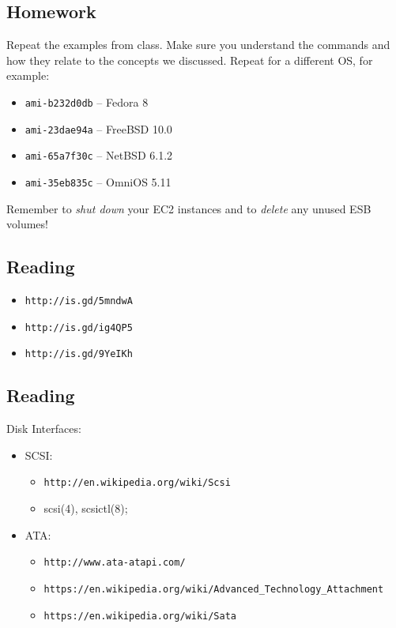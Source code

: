 \documentclass[xga]{xdvislides}
\begin{document}
\subsection{Homework}
Repeat the examples from class.  Make sure you understand the commands and
how they relate to the concepts we discussed.  Repeat for a different OS,
for example: \\

\begin{itemize}
	\item {\tt ami-b232d0db} -- Fedora 8
	\item {\tt ami-23dae94a} -- FreeBSD 10.0
	\item {\tt ami-65a7f30c} -- NetBSD 6.1.2
	\item {\tt ami-35eb835c} -- OmniOS 5.11
\end{itemize}

\vspace{.5in}
Remember to {\em shut down} your EC2 instances and to {\em delete} any unused ESB
volumes!


\subsection{Reading}
\begin{itemize}
	\item \verb+http://is.gd/5mndwA+
	\item \verb+http://is.gd/ig4QP5+
	\item \verb+http://is.gd/9YeIKh+
\end{itemize}

\subsection{Reading}
Disk Interfaces:
\begin{itemize}
	\item SCSI:
		\begin{itemize}
			\item \verb+http://en.wikipedia.org/wiki/Scsi+
			\item scsi(4), scsictl(8);
		\end{itemize}
	\item ATA:
		\begin{itemize}
			\item \verb+http://www.ata-atapi.com/+
			\item \verb+https://en.wikipedia.org/wiki/Advanced_Technology_Attachment+
			\item \verb+https://en.wikipedia.org/wiki/Sata+
		\end{itemize}
\end{itemize}
\end{document}
